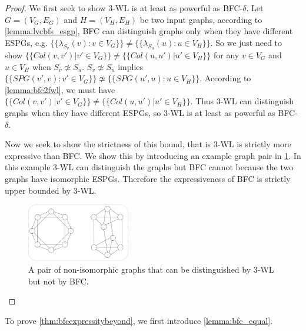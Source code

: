 \bfcthreewl*
\begin{proof}
We first seek to show 3-WL is at least as powerful as BFC-$\delta$. Let $G=(V_G, E_G)$ and $H=(V_H, E_H)$ be two input graphs, according to \cref{lemma:lvcbfs_esgp}, BFC can distinguish graphs only when they have different ESPGs, e.g. $\{\!\!\{\lambda_{S_v}(v): v\in V_G\}\!\!\} \neq \{\!\!\{\lambda_{S_u}(u): u\in V_H\}\!\!\}$. So we just need to show $\{\!\!\{Col(v,v') | v' \in V_G \}\!\!\} \neq \{\!\!\{Col(u,u') | u' \in V_H \}\!\!\}$ for any $v\in V_G$ and $u\in V_H$ when $S_v \not\simeq S_u$. 
$S_v\not\simeq S_u$ implies $\{\!\!\{SPG(v', v): v'\in V_G\}\!\!\} \not\simeq \{\!\!\{SPG(u', u): u\in V_H\}\!\!\}$. According to \cref{lemma:bfc2fwl}, we must have $\{\!\!\{Col(v,v') | v' \in V_G \}\!\!\} \neq \{\!\!\{Col(u,u') | u' \in V_H \}\!\!\}$. Thus 3-WL can distinguish graphs when they have different ESPGs, so 3-WL is at least as powerful as BFC-$\delta$.

Now we seek to show the strictness of this bound, that is 3-WL is strictly more expressive than BFC. We show this by introducing an example graph pair in \cref{fig:bfc3wl}. In this example 3-WL can distinguish the graphs but BFC cannot because the two graphs have isomorphic ESPGs. Therefore the expressiveness of BFC is strictly upper bounded by 3-WL.

\begin{figure}[ht]
\centering
\includegraphics[clip,width=0.4\textwidth]{figures/BFC3WL.pdf}
\caption{A pair of non-isomorphic graphs that can be distinguished by 3-WL but not by BFC.}
\label{fig:bfc3wl}
\end{figure}

\end{proof}

To prove \cref{thm:bfcexpressitybeyond}, we first introduce \cref{lemma:bfc_equal}.






